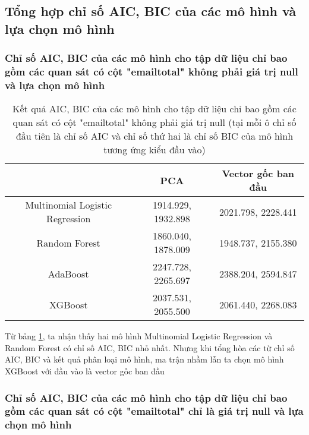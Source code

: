 \subsection{Tổng hợp chỉ số AIC, BIC của các mô hình và lựa chọn mô hình}

\subsubsection{Chỉ số AIC, BIC của các mô hình cho tập dữ liệu chỉ bao gồm các quan sát có cột "emailtotal" không phải giá trị null và lựa chọn mô hình}

\begin{table}[h!]
    \centering
    \begin{tabular}{|c|c|c|}
        \hline
        & PCA & Vector gốc ban đầu \\
        \hline
        Multinomial Logistic Regression & 1914.929, 1932.898 & 2021.798, 2228.441 \\
        \hline
        Random Forest & 1860.040, 1878.009 & 1948.737, 2155.380 \\
        \hline
        AdaBoost & 2247.728, 2265.697 & 2388.204, 2594.847 \\
        \hline
        XGBoost & 2037.531, 2055.500 & 2061.440, 2268.083 \\
        \hline
    \end{tabular}
    \caption{Kết quả AIC, BIC của các mô hình cho tập dữ liệu chỉ bao gồm các quan sát có cột "emailtotal" không phải giá trị null (tại mỗi ô chỉ số đầu tiên là chỉ số AIC và chỉ số thứ hai là chỉ số BIC của mô hình tương ứng kiểu đầu vào)}
    \label{tab:Non_null_AIC_BIC_Models}
\end{table}

Từ bảng \ref{tab:Non_null_AIC_BIC_Models}, ta nhận thấy hai mô hình Multinomial Logistic Regression và Random Forest có chỉ số AIC, BIC nhỏ nhất.
Nhưng khi tổng hòa các từ chỉ số AIC, BIC và kết quả phân loại mô hình, ma trận nhầm lẫn ta chọn mô hình XGBoost với đầu vào là vector gốc ban đầu


\subsubsection{Chỉ số AIC, BIC của các mô hình cho tập dữ liệu chỉ bao gồm các quan sát có cột "emailtotal" chỉ là giá trị null và lựa chọn mô hình}

